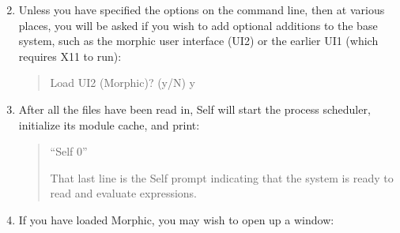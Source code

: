 \documentclass[letterpaper,10pt,english]{sphinxmanual}
\begin{document}
\begin{enumerate}
\setcounter{enumi}{1}
\item {} 
Unless you have specified the options on the command line, then at various places, you will be asked if you wish to add optional additions to the base system, such as the morphic user interface (UI2) or the earlier UI1 (which requires X11 to run):
\begin{quote}

\begin{sphinxVerbatim}[commandchars=\\\{\}]
Load UI2 (Morphic)? (y/N)
\PYGZgt{} y
\end{sphinxVerbatim}
\end{quote}

\item {} 
After all the files have been read in, Self will start the process scheduler, initialize its module cache, and print:
\begin{quote}

\begin{sphinxVerbatim}[commandchars=\\\{\}]
“Self 0”
\end{sphinxVerbatim}

That last line is the Self prompt indicating that the system is ready to read and evaluate expressions.
\end{quote}

\item {} 
If you have loaded Morphic, you may wish to open up a window:
\begin{quote}

\begin{sphinxVerbatim}[commandchars=\\\{\}]
  
     
 

      
    
         
   

\end{sphinxVerbatim}
\end{quote}

\end{enumerate}
\end{document}
